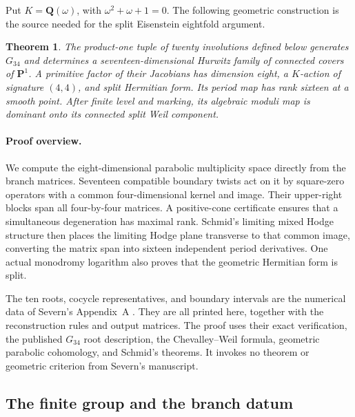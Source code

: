 \documentclass[11pt]{article}
\newtheorem{theorem}{Theorem}[section]
\theoremstyle{definition}
\theoremstyle{remark}
\begin{document}
Put $K=\mathbf Q(\omega)$, with $\omega^2+\omega+1=0$.
The following geometric construction is the source needed for the
split Eisenstein eightfold argument.

\begin{theorem}\label{thm:eisenstein-hurwitz-dominance}
The product-one tuple of twenty involutions defined below generates
$G_{34}$ and determines a seventeen-dimensional Hurwitz family of
connected covers of $\mathbf P^1$.  A primitive factor of their Jacobians
has dimension eight, a $K$-action of signature $(4,4)$, and split
Hermitian form.  Its period map has rank sixteen at a smooth point.
After finite level and marking, its algebraic moduli map is dominant
onto its connected split Weil component.
\end{theorem}

\paragraph{Proof overview.}
We compute the eight-dimensional parabolic multiplicity space directly
from the branch matrices.  Seventeen compatible boundary twists act on
it by square-zero operators with a common four-dimensional kernel and
image.  Their upper-right blocks span all four-by-four matrices.  A
positive-cone certificate ensures that a simultaneous degeneration has
maximal rank.  Schmid's limiting mixed Hodge structure then places the
limiting Hodge plane transverse to that common image, converting the
matrix span into sixteen independent period derivatives.  One actual
monodromy logarithm also proves that the geometric Hermitian form is
split.

The ten roots, cocycle representatives, and boundary intervals are the
numerical data of Severn's Appendix~A \cite{SevernData}.  They are all
printed here, together with the reconstruction rules and output
matrices.  The proof uses their exact verification, the published
$G_{34}$ root description, the Chevalley--Weil formula, geometric
parabolic cohomology, and Schmid's theorems.  It invokes no theorem or
geometric criterion from Severn's manuscript.

\subsection{The finite group and the branch datum}
\end{document}
